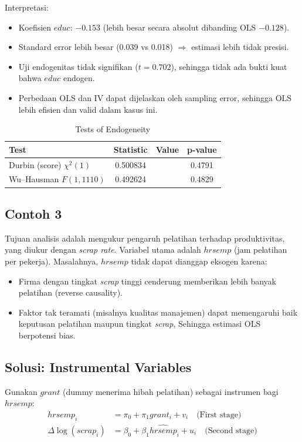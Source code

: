 \documentclass[]{article}
\begin{document}
Interpretasi:
\begin{itemize}
    \item Koefisien $educ$: $-0.153$ (lebih besar secara absolut dibanding OLS $-0.128$).
    \item Standard error lebih besar (0.039 vs 0.018) $\Rightarrow$ estimasi lebih tidak presisi.
    \item Uji endogenitas tidak signifikan ($t = 0.702$), sehingga tidak ada bukti kuat bahwa $educ$ endogen.
    \item Perbedaan OLS dan IV dapat dijelaskan oleh sampling error, sehingga OLS lebih efisien dan valid dalam kasus ini.
\end{itemize}
\begin{table}[htb]
\centering
\caption{Tests of Endogeneity}
\begin{tabular}{lccc}
\hline
Test & Statistic & Value & p-value \\
\hline
Durbin (score) $\chi^{2}(1)$ & 0.500834 & & 0.4791 \\
Wu--Hausman $F(1,1110)$      & 0.492624 & & 0.4829 \\
\hline
\end{tabular}
\end{table}

\newpage
\subsection{Contoh 3}
Tujuan analisis adalah mengukur pengaruh pelatihan terhadap produktivitas, yang diukur dengan \emph{scrap rate}. 
Variabel utama adalah $hrsemp$ (jam pelatihan per pekerja).  Masalahnya, $hrsemp$ tidak dapat dianggap eksogen karena:
\begin{itemize}
  \item Firma dengan tingkat \emph{scrap} tinggi cenderung memberikan lebih banyak pelatihan (reverse causality).
  \item Faktor tak teramati (misalnya kualitas manajemen) dapat memengaruhi baik keputusan pelatihan maupun tingkat \emph{scrap}, Sehingga estimasi OLS berpotensi bias.
\end{itemize}


\subsection*{Solusi: Instrumental Variables}
Gunakan $grant$ (dummy menerima hibah pelatihan) sebagai instrumen bagi $hrsemp$:
\begin{align}
hrsemp_i &= \pi_0 + \pi_1 grant_i + v_i \quad \text{(First stage)} \\[6pt]
\Delta \log(scrap_i) &= \beta_0 + \beta_1 \hat{hrsemp}_i + u_i \quad \text{(Second stage)}
\end{align}
\end{document}
